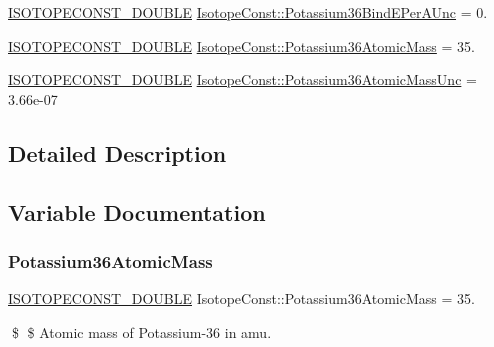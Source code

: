 \begin{DoxyCompactItemize}
\mbox{\hyperlink{group___isotope_const-_macros_ga8f45a7272ce02c0b4c65c44636ed719a}{I\+S\+O\+T\+O\+P\+E\+C\+O\+N\+S\+T\+\_\+\+D\+O\+U\+B\+LE}} \mbox{\hyperlink{group___isotope_const-_potassium-_k36_gab638d3f937f1f28f3a0d4c95a639d8c8}{Isotope\+Const\+::\+Potassium36\+Bind\+E\+Per\+A\+Unc}} = 0.
\item 
\mbox{\hyperlink{group___isotope_const-_macros_ga8f45a7272ce02c0b4c65c44636ed719a}{I\+S\+O\+T\+O\+P\+E\+C\+O\+N\+S\+T\+\_\+\+D\+O\+U\+B\+LE}} \mbox{\hyperlink{group___isotope_const-_potassium-_k36_ga429acaa091544b4bae7e38362732d139}{Isotope\+Const\+::\+Potassium36\+Atomic\+Mass}} = 35.
\item 
\mbox{\hyperlink{group___isotope_const-_macros_ga8f45a7272ce02c0b4c65c44636ed719a}{I\+S\+O\+T\+O\+P\+E\+C\+O\+N\+S\+T\+\_\+\+D\+O\+U\+B\+LE}} \mbox{\hyperlink{group___isotope_const-_potassium-_k36_ga28627807f867c974c99350db3f43364b}{Isotope\+Const\+::\+Potassium36\+Atomic\+Mass\+Unc}} = 3.\+66e-\/07
\end{DoxyCompactItemize}


\subsection{Detailed Description}


\subsection{Variable Documentation}
\mbox{\label{group___isotope_const-_potassium-_k36_ga429acaa091544b4bae7e38362732d139}} 
\subsubsection{\texorpdfstring{Potassium36\+Atomic\+Mass}{Potassium36AtomicMass}}
{\footnotesize\ttfamily \mbox{\hyperlink{group___isotope_const-_macros_ga8f45a7272ce02c0b4c65c44636ed719a}{I\+S\+O\+T\+O\+P\+E\+C\+O\+N\+S\+T\+\_\+\+D\+O\+U\+B\+LE}} Isotope\+Const\+::\+Potassium36\+Atomic\+Mass = 35.}

\$ \$ Atomic mass of Potassium-\/36 in amu. \mbox{\label{group___isotope_const-_potassium-_k36_ga28627807f867c974c99350db3f43364b}} 
